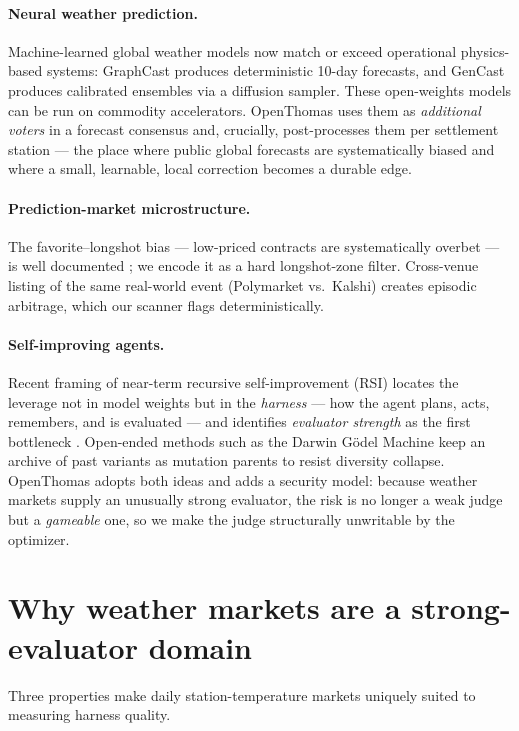\documentclass[10pt,twocolumn]{article}
\begin{document}
\paragraph{Neural weather prediction.} Machine-learned global weather models now
match or exceed operational physics-based systems: GraphCast \cite{graphcast}
produces deterministic 10-day forecasts, and GenCast \cite{gencast} produces
calibrated ensembles via a diffusion sampler. These open-weights models can be
run on commodity accelerators. OpenThomas uses them as \emph{additional voters}
in a forecast consensus and, crucially, post-processes them per settlement
station --- the place where public global forecasts are systematically biased and
where a small, learnable, local correction becomes a durable edge.

\paragraph{Prediction-market microstructure.} The favorite--longshot bias ---
low-priced contracts are systematically overbet --- is well documented
\cite{longshot}; we encode it as a hard longshot-zone filter. Cross-venue
listing of the same real-world event (Polymarket vs.\ Kalshi) creates episodic
arbitrage, which our scanner flags deterministically.

\paragraph{Self-improving agents.} Recent framing of near-term recursive
self-improvement (RSI) locates the leverage not in model weights but in the
\emph{harness} --- how the agent plans, acts, remembers, and is evaluated --- and
identifies \emph{evaluator strength} as the first bottleneck \cite{harness}.
Open-ended methods such as the Darwin Gödel Machine \cite{dgm} keep an archive of
past variants as mutation parents to resist diversity collapse. OpenThomas adopts
both ideas and adds a security model: because weather markets supply an unusually
strong evaluator, the risk is no longer a weak judge but a \emph{gameable} one,
so we make the judge structurally unwritable by the optimizer.

\section{Why weather markets are a strong-evaluator domain}
\label{sec:weather}

Three properties make daily station-temperature markets uniquely suited to
measuring harness quality.
\end{document}
